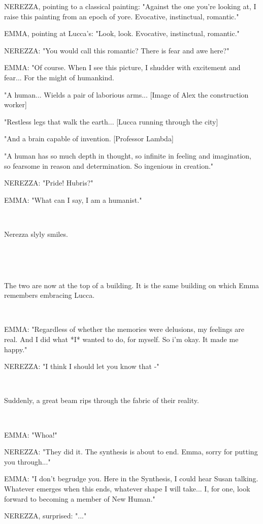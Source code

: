 \documentclass[11pt]{article}
\begin{document}
NEREZZA, pointing to a classical painting: "Against the one you're looking at, I raise this painting from an epoch of yore. 
Evocative, instinctual, romantic."

EMMA, pointing at Lucca's: "Look, look. Evocative, instinctual, romantic."

NEREZZA: "You would call this romantic? There is fear and awe here?"

EMMA: "Of course. 
When I see this picture, I shudder with excitement and fear...
For the might of humankind.

"A human... Wields a pair of laborious arms... [Image of Alex the construction worker]

"Restless legs that walk the earth... [Lucca running through the city]

"And a brain capable of invention. [Professor Lambda]

"A human has so much depth in thought,
so infinite in feeling and imagination,
so fearsome in reason and determination.
So ingenious in creation."

NEREZZA: "Pride! Hubris?"

EMMA: "What can I say, I am a humanist."

\ 

Nerezza slyly smiles.

\ 

\ 

The two are now at the top of a building.
It is the same building on which Emma remembers embracing Lucca. 

\ 

EMMA: "Regardless of whether the memories were delusions, my feelings are real.
And I did what *I* wanted to do, for myself. 
So i'm okay.
It made me happy."

NEREZZA: "I think I should let you know that -"

\ 

Suddenly, a great beam rips through the fabric of their reality.

\ 

EMMA: "Whoa!"

NEREZZA: "They did it. 
The synthesis is about to end.
Emma, sorry for putting you through..."

EMMA: "I don't begrudge you. 
Here in the Synthesis, I could hear Susan talking.
Whatever emerges when this ends, whatever shape I will take...
I, for one, look forward to becoming a member of New Human."

NEREZZA, surprised: "..."
\end{document}
